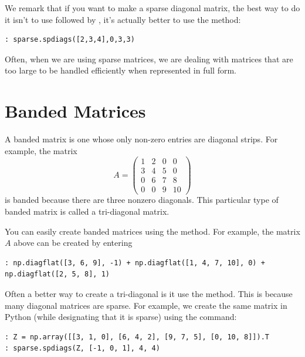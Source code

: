 We remark that if you want to make a sparse diagonal matrix, the
best way to do it isn't to use  followed by ,
it's actually better to use the  method:
\begin{lstlisting}
: sparse.spdiags([2,3,4],0,3,3)
\end{lstlisting}
Often, when we are using sparse matrices, we are dealing with matrices 
that are too large to be handled efficiently when represented in full form.

\section*{Banded Matrices}
A banded matrix is one whose only non-zero entries are diagonal
strips.  For example, the matrix
\begin{equation*}
A = \begin{pmatrix} 
1 & 2 & 0 & 0 \\
3 & 4 & 5 & 0 \\
0 & 6 & 7 & 8 \\
0 & 0 & 9 & 10
\end{pmatrix}
\end{equation*}
is banded because there are three nonzero diagonals.  This
particular type of banded matrix is called a tri-diagonal matrix.

You can easily create banded matrices using the  method.
For example, the matrix $A$ above can be created by entering
\begin{lstlisting}
: np.diagflat([3, 6, 9], -1) + np.diagflat([1, 4, 7, 10], 0) + np.diagflat([2, 5, 8], 1)
\end{lstlisting}

Often a better way to create a tri-diagonal is it use the  method. 
This is because many diagonal matrices are sparse. 
For example, we create the same matrix in Python (while designating that it is sparse) using the command:
\begin{lstlisting}
: Z = np.array([[3, 1, 0], [6, 4, 2], [9, 7, 5], [0, 10, 8]]).T
: sparse.spdiags(Z, [-1, 0, 1], 4, 4)
\end{lstlisting}

